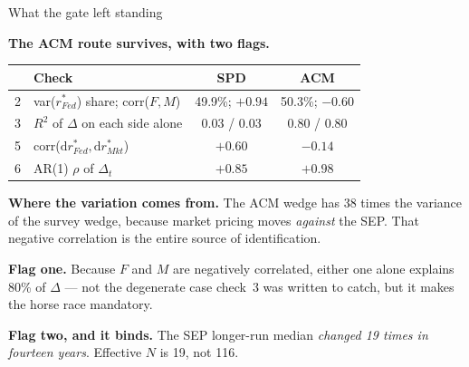 \documentclass[aspectratio=169, 11pt]{beamer}
\newcommand{\rstar}{r^{*}}
\newcommand{\lives}{\textcolor{liveteal}{\textbf{survives}}}
\begin{document}
\begin{frame}{What the gate left standing}

\textbf{The ACM route \lives, with two flags.}

\vspace{0.5em}

\begin{center}
\small
\begin{tabular}{llcc}
\toprule
 & Check & SPD & ACM \\
\midrule
2 & var($\rstar_{Fed}$) share; corr($F,M$) & 49.9\%; $+0.94$ & 50.3\%; $\mathbf{-0.60}$ \\
3 & $R^{2}$ of $\Delta$ on each side alone & 0.03 / 0.03 & \textcolor{killred}{0.80 / 0.80} \\
5 & corr($\mathrm{d}\rstar_{Fed}, \mathrm{d}\rstar_{Mkt}$) & $+0.60$ & $-0.14$ \\
6 & AR(1) $\rho$ of $\Delta_t$ & $+0.85$ & \textcolor{killred}{$+0.98$} \\
\bottomrule
\end{tabular}
\end{center}

\vspace{0.55em}

\textbf{Where the variation comes from.} The ACM wedge has 38 times the
variance of the survey wedge, because market pricing moves \emph{against} the
SEP. That negative correlation is the entire source of identification.

\vspace{0.5em}

\textbf{Flag one.} Because $F$ and $M$ are negatively correlated, either one
alone explains 80\% of $\Delta$ --- not the degenerate case check~3 was
written to catch, but it makes the horse race mandatory.

\vspace{0.5em}

\textbf{Flag two, and it binds.} The SEP longer-run median \emph{changed 19
times in fourteen years}. Effective $N$ is 19, not 116.

\end{frame}
\end{document}
